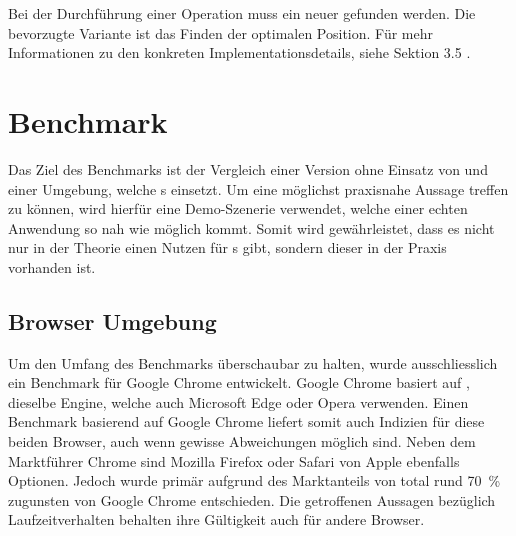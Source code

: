 Bei der Durchführung einer  Operation muss ein neuer  gefunden werden. Die bevorzugte Variante ist das Finden der optimalen Position. Für mehr Informationen zu den konkreten Implementationsdetails, siehe  Sektion 3.5 \cite{quadridBasedSurfaceSimplification}.

\section{Benchmark}

Das Ziel des Benchmarks ist der Vergleich einer Version ohne Einsatz von  und einer Umgebung, welche s einsetzt. Um eine möglichst praxisnahe Aussage treffen zu können, wird hierfür eine Demo-Szenerie verwendet, welche einer echten Anwendung so nah wie möglich kommt. Somit wird gewährleistet, dass es nicht nur in der Theorie einen Nutzen für s gibt, sondern dieser in der Praxis vorhanden ist.

\subsection{Browser Umgebung}
Um den Umfang des Benchmarks überschaubar zu halten, wurde ausschliesslich ein Benchmark für Google Chrome entwickelt.
Google Chrome basiert auf , dieselbe Engine, welche auch Microsoft Edge oder Opera verwenden.
Einen Benchmark basierend auf Google Chrome liefert somit auch Indizien für diese beiden Browser, auch wenn gewisse Abweichungen möglich sind.
Neben dem Marktführer Chrome sind Mozilla Firefox oder Safari von Apple ebenfalls Optionen. Jedoch wurde primär aufgrund des Marktanteils von total rund 70 \% \cite{browserUsage} zugunsten von Google Chrome entschieden.
Die getroffenen Aussagen bezüglich Laufzeitverhalten behalten ihre Gültigkeit auch für andere Browser.

